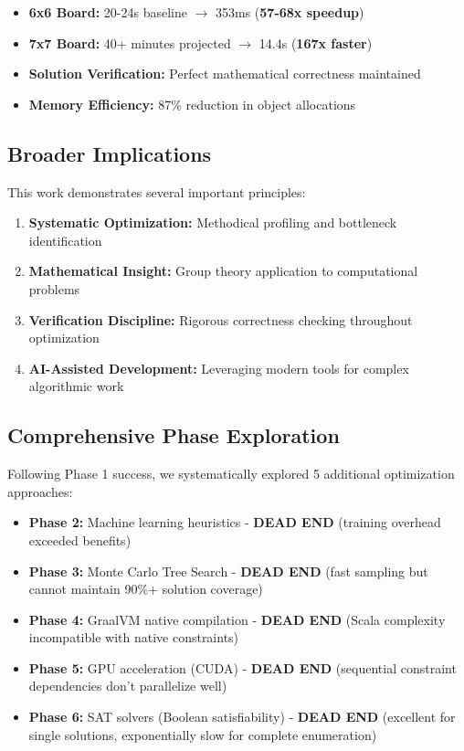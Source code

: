 \documentclass[12pt,a4paper]{article}
\theoremstyle{definition}
\begin{document}
\begin{itemize}
\item \textbf{6x6 Board:} 20-24s baseline $\rightarrow$ 353ms (\textbf{57-68x speedup})
\item \textbf{7x7 Board:} 40+ minutes projected $\rightarrow$ 14.4s (\textbf{167x faster})
\item \textbf{Solution Verification:} Perfect mathematical correctness maintained
\item \textbf{Memory Efficiency:} 87\% reduction in object allocations
\end{itemize}

\subsection{Broader Implications}

This work demonstrates several important principles:

\begin{enumerate}
\item \textbf{Systematic Optimization:} Methodical profiling and bottleneck identification
\item \textbf{Mathematical Insight:} Group theory application to computational problems  
\item \textbf{Verification Discipline:} Rigorous correctness checking throughout optimization
\item \textbf{AI-Assisted Development:} Leveraging modern tools for complex algorithmic work
\end{enumerate}

\subsection{Comprehensive Phase Exploration}

Following Phase 1 success, we systematically explored 5 additional optimization approaches:

\begin{itemize}
\item \textbf{Phase 2:} Machine learning heuristics - \textbf{DEAD END} (training overhead exceeded benefits)
\item \textbf{Phase 3:} Monte Carlo Tree Search - \textbf{DEAD END} (fast sampling but cannot maintain 90\%+ solution coverage)  
\item \textbf{Phase 4:} GraalVM native compilation - \textbf{DEAD END} (Scala complexity incompatible with native constraints)
\item \textbf{Phase 5:} GPU acceleration (CUDA) - \textbf{DEAD END} (sequential constraint dependencies don't parallelize well)
\item \textbf{Phase 6:} SAT solvers (Boolean satisfiability) - \textbf{DEAD END} (excellent for single solutions, exponentially slow for complete enumeration)
\end{itemize}
\end{document}
